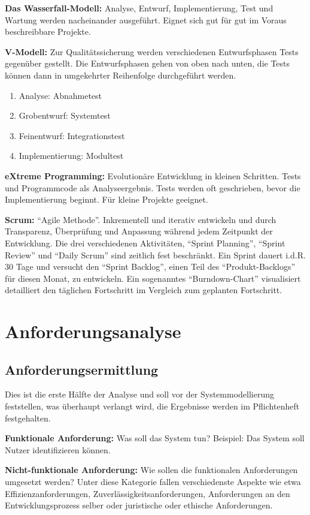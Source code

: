 \documentclass{panikzettel}
\begin{document}
\textbf{Das Wasserfall-Modell:} Analyse, Entwurf, Implementierung, Test und Wartung werden nacheinander ausgeführt. Eignet sich gut für gut im Voraus beschreibbare Projekte.

\textbf{V-Modell:} Zur Qualitätssicherung werden verschiedenen Entwurfsphasen Tests gegenüber gestellt. Die Entwurfsphasen gehen von oben nach unten, die Tests können dann in umgekehrter Reihenfolge durchgeführt werden.
\begin{enumerate}
\item Analyse: Abnahmetest
\item Grobentwurf: Systemtest
\item Feinentwurf: Integrationstest
\item Implementierung: Modultest
\end{enumerate}

\textbf{eXtreme Programming:} Evolutionäre Entwicklung in kleinen Schritten. Tests und Programmcode als Analyseergebnis. Tests werden oft geschrieben, bevor die Implementierung beginnt. Für kleine Projekte geeignet.

\textbf{Scrum:} ``Agile Methode''. Inkrementell und iterativ entwickeln und durch Transparenz, Überprüfung und Anpassung während jedem Zeitpunkt der Entwicklung. Die drei verschiedenen Aktivitäten, ``Sprint Planning'', ``Sprint Review'' und ``Daily Scrum'' sind zeitlich fest beschränkt. Ein Sprint dauert i.d.R. 30 Tage und versucht den ``Sprint Backlog'', einen Teil des ``Produkt-Backlogs'' für diesen Monat, zu entwickeln. Ein sogenanntes ``Burndown-Chart'' visualisiert detailliert den täglichen Fortschritt im Vergleich zum geplanten Fortschritt.

\section{Anforderungsanalyse}

\subsection{Anforderungsermittlung}

Dies ist die erste Hälfte der Analyse und soll vor der Systemmodellierung feststellen, was überhaupt verlangt wird, die Ergebnisse werden im Pflichtenheft festgehalten.

\textbf{Funktionale Anforderung:} Was soll das System tun? Beispiel: Das System soll Nutzer identifizieren können.

\textbf{Nicht-funktionale Anforderung:} Wie sollen die funktionalen Anforderungen umgesetzt werden? Unter diese Kategorie fallen verschiedenste Aspekte wie etwa Effizienzanforderungen, Zuverlässigkeitsanforderungen, Anforderungen an den Entwicklungsprozess selber oder juristische oder ethische Anforderungen.
\end{document}
